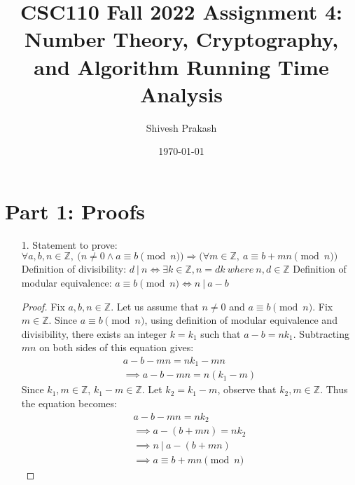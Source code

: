 \documentclass[11pt]{article}
\title{CSC110 Fall 2022 Assignment 4: Number Theory, Cryptography, and Algorithm Running Time Analysis}
\author{Shivesh Prakash}
\date{\today}
\begin{document}
\maketitle


\section*{Part 1: Proofs}

\begin{enumerate}
\item[1.] Statement to prove:
$\forall a, b, n \in \mathbb{Z},~ \big(n \neq 0 \land a \equiv b \pmod n \big) \Rightarrow \big(\forall m \in \mathbb{Z},~ a \equiv b + mn \pmod n\big)$
\newline\newline\newline
Definition of divisibility: $d ~ \vert ~ n \iff \exists k \in \mathbb{Z}, n = dk ~ where ~ n, d \in \mathbb{Z}$ \newline
Definition of modular equivalence: $a \equiv b \pmod n \iff n ~ \vert ~ a - b$
\begin{proof}
Fix $a, b, n \in \mathbb{Z}$. \newline
Let us assume that $n \neq 0$ and $a \equiv b \pmod n$. \newline
Fix $m \in \mathbb{Z}$. \newline
Since $a \equiv b \pmod n$, using definition of modular equivalence and divisibility, \newline there exists an integer $k = k_{1}$ such that $a - b = nk_{1}$. \newline
Subtracting $mn$ on both sides of this equation gives: 
\begin{gather*}
a - b - mn = nk_{1} - mn \\
\implies a - b - mn = n(k_{1} - m)
\end{gather*}
Since $k_{1}, m \in \mathbb{Z}$, $k_{1} - m \in \mathbb{Z}$. Let $k_{2}= k_{1} - m$, observe that $k_{2}, m \in \mathbb{Z}$. \newline
Thus the equation becomes: \newline
\begin{gather*}
a - b - mn = nk_{2} \\
\implies a - (b + mn) = nk_{2} \\
\implies n ~ \vert ~ a - (b + mn) \\
\implies a \equiv b + mn \pmod n
\end{gather*}
\end{proof}


\end{enumerate}
\end{document}
